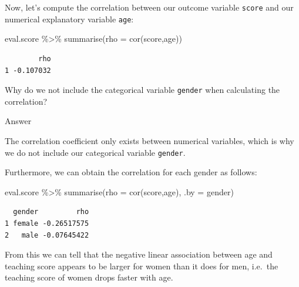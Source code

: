\documentclass[
  letterpaper,
  DIV=11,
  numbers=noendperiod]{scrartcl}
\newenvironment{Shaded}{\begin{snugshade}}{\end{snugshade}}
\newcommand{\AttributeTok}[1]{\textcolor[rgb]{0.40,0.45,0.13}{#1}}
\newcommand{\FunctionTok}[1]{\textcolor[rgb]{0.28,0.35,0.67}{#1}}
\newcommand{\NormalTok}[1]{\textcolor[rgb]{0.00,0.23,0.31}{#1}}
\newcommand{\SpecialCharTok}[1]{\textcolor[rgb]{0.37,0.37,0.37}{#1}}
\begin{document}
Now, let's compute the correlation between our outcome variable
\texttt{score} and our numerical explanatory variable \texttt{age}:

\begin{Shaded}
\begin{Highlighting}[]
\NormalTok{eval.score }\SpecialCharTok{\%\textgreater{}\%}
  \FunctionTok{summarise}\NormalTok{(}\AttributeTok{rho =} \FunctionTok{cor}\NormalTok{(score,age))}
\end{Highlighting}
\end{Shaded}

\begin{verbatim}
        rho
1 -0.107032
\end{verbatim}

\begin{tcolorbox}[enhanced jigsaw, colback=white, toptitle=1mm, bottomrule=.15mm, colbacktitle=quarto-callout-tip-color!10!white, breakable, title={Question}, colframe=quarto-callout-tip-color-frame, opacitybacktitle=0.6, toprule=.15mm, arc=.35mm, coltitle=black, leftrule=.75mm, bottomtitle=1mm, titlerule=0mm, opacityback=0, rightrule=.15mm, left=2mm]

Why do we not include the categorical variable \texttt{gender} when
calculating the correlation?

Answer

The correlation coefficient only exists between numerical variables,
which is why we do not include our categorical variable \texttt{gender}.

\end{tcolorbox}

Furthermore, we can obtain the correlation for each gender as follows:

\begin{Shaded}
\begin{Highlighting}[]
\NormalTok{eval.score }\SpecialCharTok{\%\textgreater{}\%}
  \FunctionTok{summarise}\NormalTok{(}\AttributeTok{rho =} \FunctionTok{cor}\NormalTok{(score,age),}
            \AttributeTok{.by =}\NormalTok{ gender)}
\end{Highlighting}
\end{Shaded}

\begin{verbatim}
  gender         rho
1 female -0.26517575
2   male -0.07645422
\end{verbatim}

From this we can tell that the negative linear association between age
and teaching score appears to be larger for women than it does for men,
i.e.~the teaching score of women drops faster with age.
\end{document}
